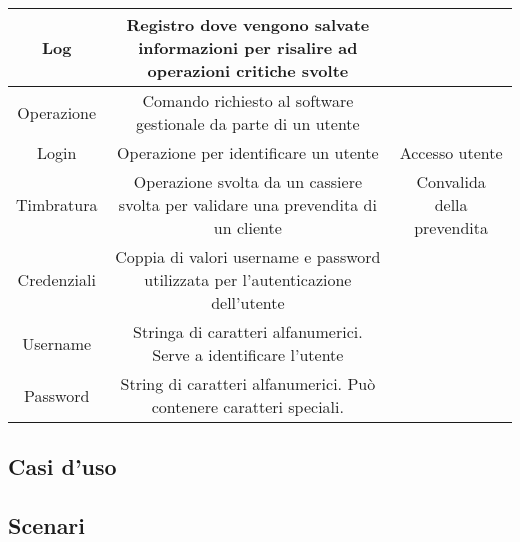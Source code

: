 \documentclass[a4paper]{article}
\begin{document}
\begin{table}[ht!]
\begin{center}
\begin{tabulary}{1\textwidth}{c|C|C}
		\hline
		Log & Registro dove vengono salvate informazioni per risalire ad operazioni critiche svolte & \\
		\hline
		Operazione & Comando richiesto al software gestionale da parte di un utente & \\
		\hline
		Login & Operazione per identificare un utente & Accesso utente \\
		\hline
		Timbratura & Operazione svolta da un cassiere svolta per validare una prevendita di un cliente & Convalida della prevendita \\
		\hline
		Credenziali & Coppia di valori username e password utilizzata per l'autenticazione dell'utente & \\
		\hline
		Username & Stringa di caratteri alfanumerici. Serve a identificare l'utente & \\
		\hline
		Password & String di caratteri alfanumerici. Può contenere caratteri speciali. & \\
		\hline
    \end{tabulary}
  \end{center}
\end{table}

\newpage

\subsection{Casi d'uso}


\subsection{Scenari}
\end{document}

